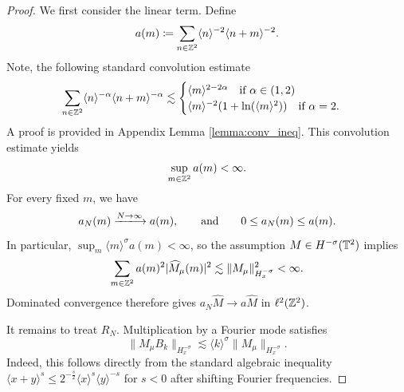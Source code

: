 \begin{proof}
    We first consider the linear term. Define
    \[
        a(m)
        \coloneqq
        \sum_{n\in\mathbb{Z}^2}
        \langle n\rangle^{-2}
        \langle n+m\rangle^{-2}.
    \]
    Note, the following standard convolution estimate
    \begin{align}\label{eq:conv_ineq}
        \sum_{n \in \mathbb{Z}^2} \langle n \rangle^{-\alpha} \langle n + m \rangle^{-\alpha} \lesssim 
        \begin{cases}
             \langle m\rangle^{2-2\alpha} \quad \text{if $\alpha \in (1,2)$}
             \\
             \langle m\rangle^{-2} (1+\ln(\langle m\rangle^2)) \quad \text{if $\alpha = 2$.}
        \end{cases}
    \end{align}
    A proof is provided in Appendix Lemma \ref{lemma:conv_ineq}.
    This convolution estimate yields
    \begin{align}\label{eq:a_m_uniform_bound}
        \sup_{m\in\mathbb{Z}^2}a(m)<\infty.
    \end{align}
    For every fixed \(m\), we have
    \[
        a_N(m)\xlongrightarrow[]{N \to \infty} a(m),
        \qquad \text{and} \qquad
        0\leq a_N(m)\leq a(m).
    \]
    In particular, $\sup_m\langle m\rangle^\sigma a(m)<\infty$,
    so the assumption $M\in H^{-\sigma}(\mathbb{T}^2)$ implies
    \[
        \sum_{m\in\mathbb{Z}^2}
        a(m)^2|\widehat M_\mu(m)|^2
        \lesssim
        \|M_\mu\|_{H^{-\sigma}_x}^2<\infty.
    \]
    Dominated convergence therefore gives
    $a_N\widehat M\to a\widehat M$ in $\ell^2(\mathbb{Z}^2)$.


    It remains to treat \(R_N\). Multiplication by a Fourier mode
    satisfies
    \begin{equation}\label{eq:modulation_Hminus_sigma}
        \|M_\mu B_k\|_{H^{-\sigma}_x}
        \lesssim
        \langle k\rangle^\sigma
        \|M_\mu\|_{H^{-\sigma}_x}.
    \end{equation}
    Indeed, this follows directly from the standard algebraic inequality $\langle x+y \rangle^s \le 2^{-\frac{s}{2}} \langle x \rangle^s \langle y \rangle^{-s}$ for $s < 0$ after shifting Fourier frequencies.


\end{proof}
